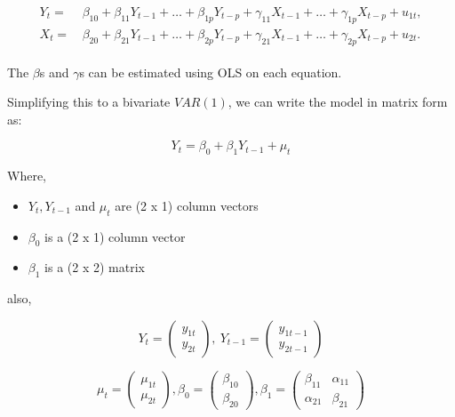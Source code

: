 \documentclass[
  12pt,
]{article}
\providecommand{\tightlist}{%
  \setlength{\itemsep}{0pt}\setlength{\parskip}{0pt}}
\begin{document}
\begin{equation}
\label{eqn:vector-regression-ts}
\begin{split}
\begin{aligned}
  Y_t =& \, \beta_{10} + \beta_{11} Y_{t-1} + \dots + \beta_{1p} Y_{t-p} + \gamma_{11} X_{t-1} + \dots + \gamma_{1p} X_{t-p} + u_{1t}, \\
  X_t =& \, \beta_{20} + \beta_{21} Y_{t-1} + \dots + \beta_{2p} Y_{t-p} + \gamma_{21} X_{t-1} + \dots + \gamma_{2p} X_{t-p} + u_{2t}.
\end{aligned}
\end{split}
\end{equation}

The \(\beta\)s and \(\gamma\)s can be estimated using OLS on each equation.

Simplifying this to a bivariate \(VAR(1)\), we can write the model in matrix form as:

\begin{equation}
\label{eqn:matix-var1-model}
Y_t = \beta_0 + \beta_1 Y_{t-1} + \mu_t
\end{equation}

Where,

\begin{itemize}
\tightlist
\item
  \(Y_t, Y_{t-1}\) and \(\mu_t\) are (2 x 1) column vectors
\item
  \(\beta_0\) is a (2 x 1) column vector
\item
  \(\beta_1\) is a (2 x 2) matrix
\end{itemize}

also,

\[
Y_t = 
\begin{pmatrix} 
y_{1t} \\
y_{2t}
\end{pmatrix},\ 
Y_{t-1} = 
\begin{pmatrix} 
y_{1t-1} \\
y_{2t-1}
\end{pmatrix}
\]

\[
\mu_t = 
\begin{pmatrix} 
\mu_{1t} \\
\mu_{2t}
\end{pmatrix},
\beta_{0} = 
\begin{pmatrix} 
\beta_{10} \\
\beta_{20}
\end{pmatrix},
\beta_{1} = 
\begin{pmatrix} 
\beta_{11} & \alpha_{11} \\
\alpha_{21} & \beta_{21}
\end{pmatrix}
\]
\end{document}
